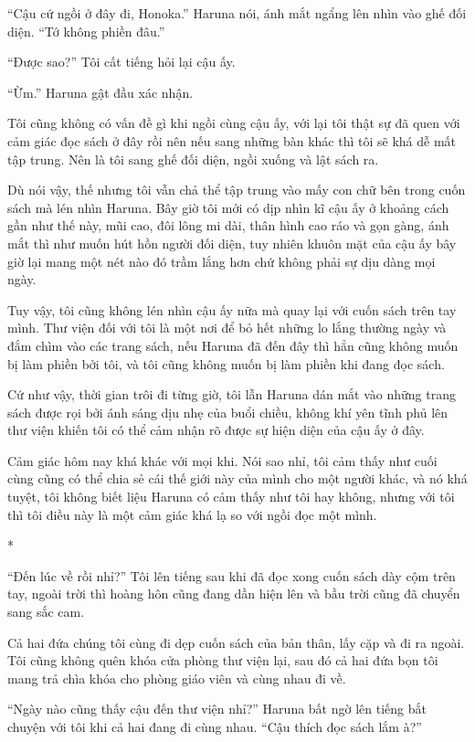 {``Cậu cứ ngồi ở đây đi, Honoka.'' Haruna nói, ánh mắt ngẩng lên nhìn vào
ghế đối diện. ``Tớ không phiền đâu.''

``Được sao?'' Tôi cất tiếng hỏi lại cậu ấy.

``Ừm.'' Haruna gật đầu xác nhận.

Tôi cũng không có vấn đề gì khi ngồi cùng cậu ấy, với lại tôi thật sự đã
quen với cảm giác đọc sách ở đây rồi nên nếu sang những bàn khác thì tôi
sẽ khá dễ mất tập trung. Nên là tôi sang ghế đối diện, ngồi xuống và lật
sách ra.

Dù nói vậy, thế nhưng tôi vẫn chả thể tập trung vào mấy con chữ bên
trong cuốn sách mà lén nhìn Haruna. Bây giờ tôi mới có dịp nhìn kĩ cậu
ấy ở khoảng cách gần như thế này, mũi cao, đôi lông mi dài, thân hình
cao ráo và gọn gàng, ánh mắt thì như muốn hút hồn người đối diện, tuy
nhiên khuôn mặt của cậu ấy bây giờ lại mang một nét nào đó trầm lắng hơn
chứ không phải sự dịu dàng mọi ngày.

Tuy vậy, tôi cũng không lén nhìn cậu ấy nữa mà quay lại với cuốn sách
trên tay mình. Thư viện đối với tôi là một nơi để bỏ hết những lo lắng
thường ngày và đắm chìm vào các trang sách, nếu Haruna đã đến đây thì
hẳn cũng không muốn bị làm phiền bởi tôi, và tôi cũng không muốn bị làm
phiền khi đang đọc sách.

Cứ như vậy, thời gian trôi đi từng giờ, tôi lẫn Haruna dán mắt vào những
trang sách được rọi bởi ánh sáng dịu nhẹ của buổi chiều, không khí yên
tĩnh phủ lên thư viện khiến tôi có thể cảm nhận rõ được sự hiện diện của
cậu ấy ở đây.

Cảm giác hôm nay khá khác với mọi khi. Nói sao nhỉ, tôi cảm thấy như
cuối cùng cũng có thể chia sẻ cái thế giới này của mình cho một người
khác, và nó khá tuyệt, tôi không biết liệu Haruna có cảm thấy như tôi
hay không, nhưng với tôi thì tôi điều này là một cảm giác khá lạ so với
ngồi đọc một mình.

*

``Đến lúc về rồi nhỉ?'' Tôi lên tiếng sau khi đã đọc xong cuốn sách dày
cộm trên tay, ngoài trời thì hoàng hôn cũng đang dần hiện lên và bầu
trời cũng đã chuyển sang sắc cam.

Cả hai đứa chúng tôi cùng đi dẹp cuốn sách của bản thân, lấy cặp và đi
ra ngoài. Tôi cũng không quên khóa cửa phòng thư viện lại, sau đó cả hai
đứa bọn tôi mang trả chìa khóa cho phòng giáo viên và cùng nhau đi về.

``Ngày nào cũng thấy cậu đến thư viện nhỉ?'' Haruna bất ngờ lên tiếng
bắt chuyện với tôi khi cả hai đang đi cùng nhau. ``Cậu thích đọc sách
lắm à?''

}
